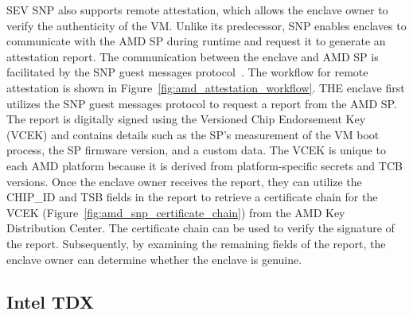 SEV SNP also supports remote attestation, which allows the enclave owner to verify the authenticity of the VM. Unlike its predecessor, SNP enables enclaves to communicate with the AMD SP during runtime and request it to generate an attestation report. The communication between the enclave and AMD SP 
is facilitated by the SNP guest messages protocol~\cite*{snp_firmware, amd_sev_summarize}. The workflow for remote attestation is shown in Figure~\ref{fig:amd_attestation_workflow}. THE enclave first utilizes the SNP guest messages protocol to request a report from the AMD SP. The report is digitally signed using the Versioned Chip Endorsement Key (VCEK) and 
contains details such as the SP's measurement of the VM boot process, the SP firmware version, and a custom data. The VCEK is unique to each AMD platform because it is derived from platform-specific secrets and TCB versions. Once the enclave owner receives the report,  they can utilize the CHIP\_ID and TSB fields 
in the report to retrieve a certificate chain for the VCEK (Figure~\ref{fig:amd_snp_certificate_chain}) from the AMD Key Distribution Center. The certificate chain can be used to verify the signature of the report. Subsequently, by examining the remaining fields of the report, the enclave owner can determine whether the 
enclave is genuine.

\subsection{Intel TDX}
\label{subsec:tdx}

